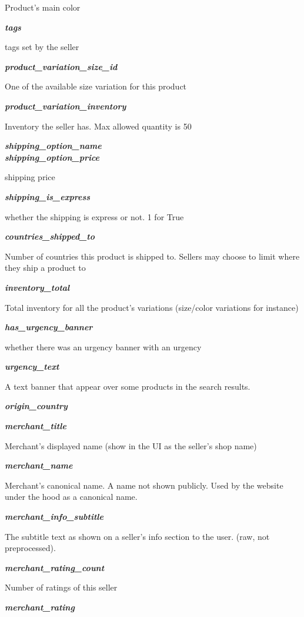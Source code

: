 \documentclass[
]{article}
\begin{document}
Product's main color

\textbf{\emph{tags}}

tags set by the seller

\textbf{\emph{product\_variation\_size\_id}}

One of the available size variation for this product

\textbf{\emph{product\_variation\_inventory}}

Inventory the seller has. Max allowed quantity is 50

\textbf{\emph{shipping\_option\_name}}\\
\textbf{\emph{shipping\_option\_price}}

shipping price

\textbf{\emph{shipping\_is\_express}}

whether the shipping is express or not. 1 for True

\textbf{\emph{countries\_shipped\_to}}

Number of countries this product is shipped to. Sellers may choose to
limit where they ship a product to

\textbf{\emph{inventory\_total}}

Total inventory for all the product's variations (size/color variations
for instance)

\textbf{\emph{has\_urgency\_banner}}

whether there was an urgency banner with an urgency

\textbf{\emph{urgency\_text}}

A text banner that appear over some products in the search results.

\textbf{\emph{origin\_country}}

\textbf{\emph{merchant\_title}}

Merchant's displayed name (show in the UI as the seller's shop name)

\textbf{\emph{merchant\_name}}

Merchant's canonical name. A name not shown publicly. Used by the
website under the hood as a canonical name.

\textbf{\emph{merchant\_info\_subtitle}}

The subtitle text as shown on a seller's info section to the user. (raw,
not preprocessed).

\textbf{\emph{merchant\_rating\_count}}

Number of ratings of this seller

\textbf{\emph{merchant\_rating}}
\end{document}
